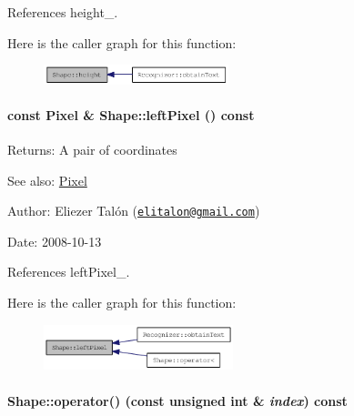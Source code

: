 References height\_\-.

Here is the caller graph for this function:\nopagebreak
\begin{figure}[H]
\begin{center}
\leavevmode
\includegraphics[width=152pt]{class_shape_8400155046b2190bce621f8f366ef2be_icgraph}
\end{center}
\end{figure}
\hypertarget{class_shape_53d49d362234068aad0b80986fabb85d}{
\paragraph[{leftPixel}]{\setlength{\rightskip}{0pt plus 5cm}const {\bf Pixel} \& Shape::leftPixel () const}\hfill}
\label{class_shape_53d49d362234068aad0b80986fabb85d}


\begin{Desc}
\item[Returns:]A pair of coordinates\end{Desc}
\begin{Desc}
\item[See also:]\hyperlink{_shape_8hpp_535e59456e3e633842529cfa8ea103c4}{Pixel}\end{Desc}
\begin{Desc}
\item[Author:]Eliezer Talón (\href{mailto:elitalon@gmail.com}{\tt elitalon@gmail.com}) \end{Desc}
\begin{Desc}
\item[Date:]2008-10-13 \end{Desc}


References leftPixel\_\-.

Here is the caller graph for this function:\nopagebreak
\begin{figure}[H]
\begin{center}
\leavevmode
\includegraphics[width=156pt]{class_shape_53d49d362234068aad0b80986fabb85d_icgraph}
\end{center}
\end{figure}
\hypertarget{class_shape_79caae3047826779e0c8094e9882843b}{
\paragraph[{operator()}]{ Shape::operator() (const unsigned int \& {\em index}) const}\hfill}
\label{class_shape_79caae3047826779e0c8094e9882843b}


